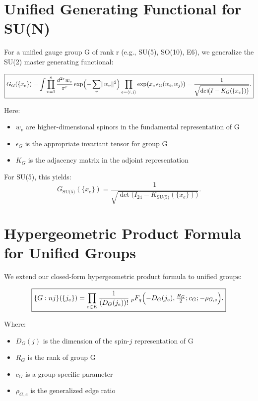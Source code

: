 \documentclass[11pt]{article}
\begin{document}
\section{Unified Generating Functional for SU(N)}

For a unified gauge group G of rank r (e.g., SU(5), SO(10), E6), we generalize the SU(2) master generating functional:

\begin{equation}
  \boxed{
  G_G(\{x_e\})
  = \int \prod_{v=1}^n \frac{d^{2r}w_v}{\pi^r} 
    \exp\Bigl(-\sum_{v}\lVert w_v\rVert^2\Bigr)
    \prod_{e=\langle i,j\rangle}\exp\bigl(x_e\,\epsilon_G(w_i,w_j)\bigr)
  = \frac{1}{\sqrt{\det\!\bigl(I - K_G(\{x_e\})\bigr)}}.
  }
\end{equation}

Here:
\begin{itemize}
    \item $w_v$ are higher-dimensional spinors in the fundamental representation of G
    \item $\epsilon_G$ is the appropriate invariant tensor for group G
    \item $K_G$ is the adjacency matrix in the adjoint representation
\end{itemize}

For SU(5), this yields:
\begin{equation}
  G_{\text{SU(5)}}(\{x_e\})
  = \frac{1}{\sqrt{\det\!\bigl(I_{24} - K_{\text{SU(5)}}(\{x_e\})\bigr)}}.
\end{equation}

\section{Hypergeometric Product Formula for Unified Groups}

We extend our closed-form hypergeometric product formula to unified groups:

\begin{equation}
  \boxed{
  \{G:nj\}(\{j_e\})
  =\prod_{e\in E}\frac{1}{(D_G(j_e))!}\;
  {}_pF_q\Bigl(-D_G(j_e),\tfrac{R_G}{2};c_G;-\rho_{G,e}\Bigr).
  }
\end{equation}

Where:
\begin{itemize}
    \item $D_G(j)$ is the dimension of the spin-$j$ representation of G
    \item $R_G$ is the rank of group G
    \item $c_G$ is a group-specific parameter
    \item $\rho_{G,e}$ is the generalized edge ratio
\end{itemize}
\end{document}
